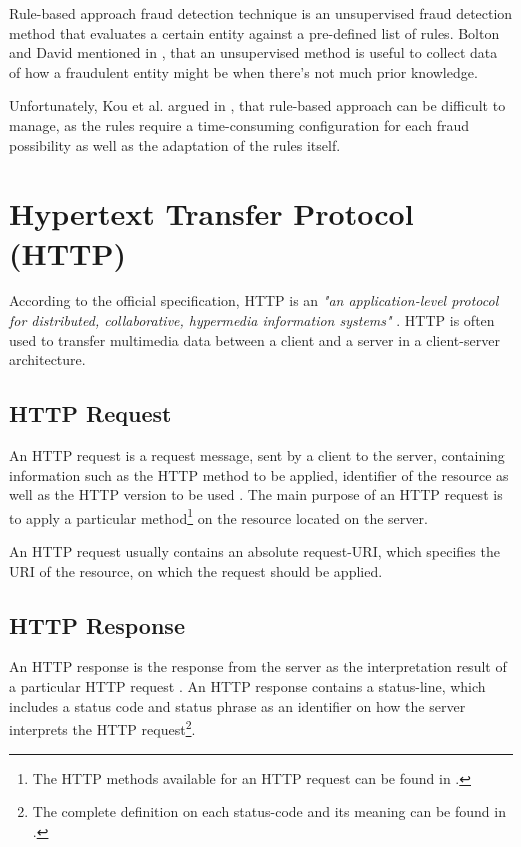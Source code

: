       Rule-based approach fraud detection technique is an unsupervised fraud detection method that evaluates a certain entity against a pre-defined list of rules. Bolton and David mentioned in \autocite{statistical-fds}, that an unsupervised method is useful to collect data of how a fraudulent entity might be when there's not much prior knowledge.

      Unfortunately, Kou et al. argued in \autocite{1297040}, that rule-based approach can be difficult to manage, as the rules require a time-consuming configuration for each fraud possibility as well as the adaptation of the rules itself. 

  \section{Hypertext Transfer Protocol (HTTP)}
  
    According to the official specification, HTTP is an \emph{"an application-level protocol for distributed, collaborative, hypermedia information systems"} \autocite{http-rfc}. HTTP is often used to transfer multimedia data between a client and a server in a client-server architecture. 
    
    \subsection{HTTP Request}

      An HTTP request is a request message, sent by a client to the server, containing information such as the HTTP method to be applied, identifier of the resource as well as the HTTP version to be used \autocite[\enquote{5 Request}]{http-rfc}. The main purpose of an HTTP request is to apply a particular method\footnote{The HTTP methods available for an HTTP request can be found in \autocite[\enquote{5.1.1 Method}]{http-rfc}.} on the resource located on the server. 
      
      An HTTP request usually contains an absolute request-URI, which specifies the URI of the resource, on which the request should be applied.  

    \subsection{HTTP Response}

      An HTTP response is the response from the server as the interpretation result of a particular HTTP request \autocite[6 Response]{http-rfc}. An HTTP response contains a status-line, which includes a status code and status phrase as an identifier on how the server interprets the HTTP request\footnote{The complete definition on each status-code and its meaning can be found in \autocite[\enquote{10 Status Code Definitions}]{http-rfc}.}. 

